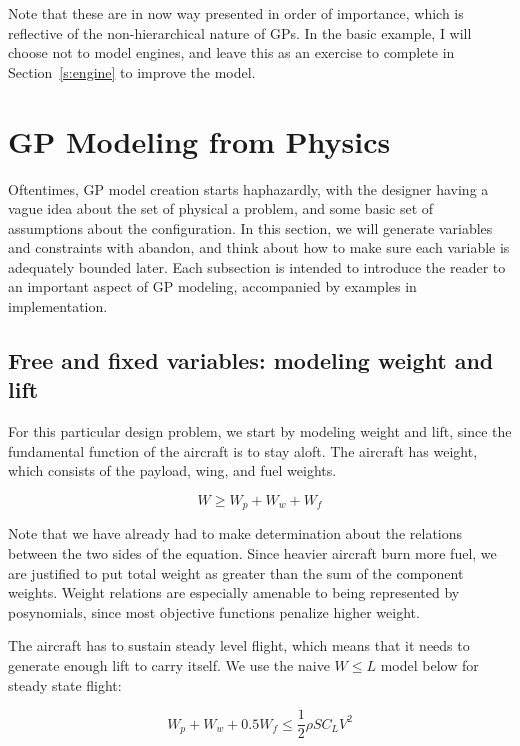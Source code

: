 Note that these are in now way presented in order of importance, which is reflective
of the non-hierarchical nature of \gls{GP}s.
In the basic example, I will choose not to model engines,
and leave this as an exercise
to complete in Section~\ref{s:engine} to improve the model.

\section{GP Modeling from Physics}

Oftentimes, \gls{GP} model creation starts haphazardly, with the designer having a
vague idea about the set of physical a problem, and some basic
set of assumptions about the configuration. In this section, we will
generate variables and constraints with abandon, and think about how to make
sure each variable is adequately bounded later. Each subsection is intended
to introduce the reader to an important aspect of \gls{GP} modeling,
accompanied by examples in implementation.

\subsection{Free and fixed variables: modeling weight and lift}
\label{s:wl}

For this particular design problem, we start by modeling
weight and lift, since the fundamental function of the aircraft is to stay aloft.
The aircraft has weight, which consists of the payload, wing, and fuel weights. 

\begin{equation}
    W \geq W_p + W_w + W_f
\end{equation}

Note that we have already had to make determination about the relations between
the two sides of the equation. Since heavier aircraft burn more fuel, we are justified
to put total weight as greater than the sum of the component weights. Weight relations
are especially amenable to being represented by posynomials, since most objective
functions penalize higher weight.

The aircraft has to sustain steady level flight, which means
that it needs to generate enough lift to carry itself. We use the naive $W \leq L$ 
model below for steady state flight:

\begin{equation}
    W_p + W_w + 0.5 W_f \leq \frac{1}{2} \rho S C_L V^2
\end{equation}

